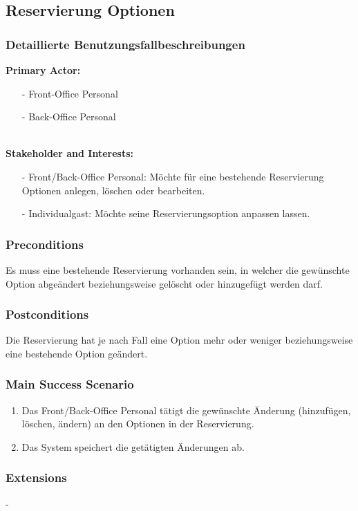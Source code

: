 \documentclass[./detailed_overview_usecases.tex]{subfiles}
\begin{document}
    \subsection{Reservierung Optionen}
    \subsubsection{Detaillierte Benutzungsfallbeschreibungen}
    \textbf{Primary Actor:}
    \begin{itemize}
        \item[-] Front-Office Personal
        \item[-] Back-Office Personal
    \end{itemize}
    \\
    \textbf{Stakeholder and Interests:}
    \begin{itemize}
        \item[-] Front/Back-Office Personal: Möchte für eine bestehende Reservierung Optionen anlegen, löschen oder bearbeiten.
        \item[-] Individualgast: Möchte seine Reservierungsoption anpassen lassen.
    \end{itemize}

    \subsubsection*{Preconditions}
    Es muss eine bestehende Reservierung vorhanden sein, in welcher die gewünschte Option abgeändert beziehungsweise gelöscht oder hinzugefügt werden darf.

    \subsubsection*{Postconditions}
    Die Reservierung hat je nach Fall eine Option mehr oder weniger beziehungsweise eine bestehende Option geändert.

    \subsubsection*{Main Success Scenario}
    \begin{enumerate}
        \item Das Front/Back-Office Personal tätigt die gewünschte Änderung (hinzufügen, löschen, ändern) an den Optionen in der Reservierung.
        \item Das System speichert die getätigten Änderungen ab.
    \end{enumerate}

    \subsubsection*{Extensions}
    -
\end{document}
